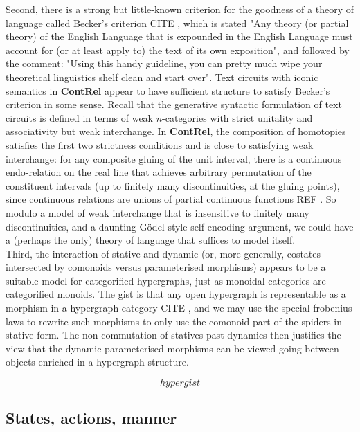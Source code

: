 Second, there is a strong but little-known criterion for the goodness of a theory of language called Becker's criterion \bR CITE \e, which is stated "Any theory (or partial theory) of the English Language that is expounded in the English Language must account for (or at least apply to) the text of its own exposition", and followed by the comment: "Using this handy guideline, you can pretty much wipe your theoretical linguistics shelf clean and start over". Text circuits with iconic semantics in \textbf{ContRel} appear to have sufficient structure to satisfy Becker's criterion in some sense. Recall that the generative syntactic formulation of text circuits is defined in terms of weak $n$-categories with strict unitality and associativity but weak interchange. In \textbf{ContRel}, the composition of homotopies satisfies the first two strictness conditions and is close to satisfying weak interchange: for any composite gluing of the unit interval, there is a continuous endo-relation on the real line that achieves arbitrary permutation of the constituent intervals (up to finitely many discontinuities, at the gluing points), since continuous relations are unions of partial continuous functions \bR REF \e. So modulo a model of weak interchange that is insensitive to finitely many discontinuities, and a daunting G\"{o}del-style self-encoding argument, we could have a (perhaps the only) theory of language that suffices to model itself.\\

Third, the interaction of stative and dynamic (or, more generally, costates intersected by comonoids versus parameterised morphisms) appears to be a suitable model for categorified hypergraphs, just as monoidal categories are categorified monoids. The gist is that any open hypergraph is representable as a morphism in a hypergraph category \bR CITE \e, and we may use the special frobenius laws to rewrite such morphisms to only use the comonoid part of the spiders in stative form. The non-commutation of statives past dynamics then justifies the view that the dynamic parameterised morphisms can be viewed going between objects enriched in a hypergraph structure.

\[hypergist\]


\subsection{States, actions, manner}\label{sec:statesactions}


